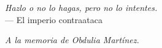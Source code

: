 \cleardoubleemptypage
\thispagestyle{empty}
{}

\vspace*{3cm}

\begin{flushright}
	\textit{Hazlo o no lo hagas, pero no lo intentes.} \\ \medskip
	--- El imperio contraataca
\end{flushright}


\medskip

\begin{flushright}
	\textit{A la memoria de Obdulia Mart\'inez.} \\ \smallskip
\end{flushright}